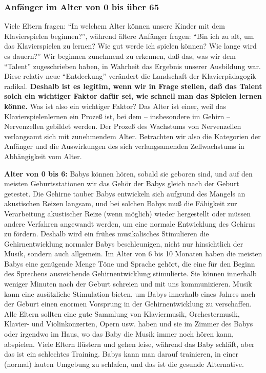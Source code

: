 \subsubsection{Anfänger im Alter von 0 bis über 65}
\label{c1iii18c}

Viele Eltern fragen: \enquote{In welchem Alter können unsere Kinder mit dem Klavierspielen beginnen?},
während ältere Anfänger fragen: \enquote{Bin ich zu alt, um das Klavierspielen zu lernen?
Wie gut werde ich spielen können?
Wie lange wird es dauern?}
Wir beginnen zunehmend zu erkennen, daß das, was wir dem \enquote{Talent} zugeschrieben haben, in Wahrheit das Ergebnis unserer Ausbildung war.
Diese relativ neue \enquote{Entdeckung} verändert die Landschaft der Klavierpädagogik radikal.
\textbf{Deshalb ist es legitim, wenn wir in Frage stellen, daß das Talent solch ein wichtiger Faktor dafür sei, wie schnell man das Spielen lernen könne.}
Was ist also ein wichtiger Faktor?
Das Alter ist einer, weil das Klavierspielenlernen ein Prozeß ist, bei dem -- insbesondere im Gehirn -- Nervenzellen gebildet werden.
Der Prozeß des Wachstums von Nervenzellen verlangsamt sich mit zunehmendem Alter.
Betrachten wir also die Kategorien der Anfänger und die Auswirkungen des sich verlangsamenden Zellwachstums in Abhängigkeit vom Alter.


\label{c1iii18c0}

\textbf{Alter von 0 bis 6:} Babys können hören, sobald sie geboren sind, und auf den meisten Geburtsstationen wir das Gehör der Babys gleich nach der Geburt getestet.
Die Gehirne tauber Babys entwickeln sich aufgrund des Mangels an akustischen Reizen langsam, und bei solchen Babys muß die Fähigkeit zur Verarbeitung akustischer Reize (wenn möglich) wieder hergestellt oder müssen andere Verfahren angewandt werden, um eine normale Entwicklung des Gehirns zu fördern.
Deshalb wird ein frühes musikalisches Stimulieren die Gehirnentwicklung normaler Babys beschleunigen, nicht nur hinsichtlich der Musik, sondern auch allgemein.
Im Alter von 6 bis 10 Monaten haben die meisten Babys eine genügende Menge Töne und Sprache gehört, die eine für den Beginn des Sprechens ausreichende Gehirnentwicklung stimulierte.
Sie können innerhalb weniger Minuten nach der Geburt schreien und mit uns kommunizieren.
Musik kann eine zusätzliche Stimulation bieten, um Babys innerhalb eines Jahres nach der Geburt einen enormen Vorsprung in der Gehirnentwicklung zu verschaffen.
Alle Eltern sollten eine gute Sammlung von Klaviermusik, Orchestermusik, Klavier- und Violinkonzerten, Opern usw. haben und sie im Zimmer des Babys oder irgendwo im Haus, wo das Baby die Musik immer noch hören kann, abspielen.
Viele Eltern flüstern und gehen leise, während das Baby schläft, aber das ist ein schlechtes Training.
Babys kann man darauf trainieren, in einer (normal) lauten Umgebung zu schlafen, und das ist die gesunde Alternative.

